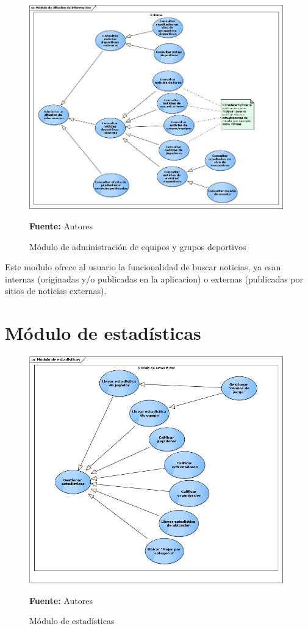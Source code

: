 \begin{figure}[!htb]
  \begin{center}
    \includegraphics[width=11cm]{./imagenes/casos_uso/difusion_informacion.png}
    \caption{Módulo de administración de equipos y grupos deportivos}
    \label{fig:cu_admin_equip_grup}
    \textbf{Fuente:} Autores
  \end{center}
\end{figure}

Este modulo ofrece al usuario la funcionalidad de buscar noticias, ya esan internas (originadas y/o publicadas en la aplicacion) o externas (publicadas por sitios de noticias externas).

\section{Módulo de estadísticas}

\begin{figure}[!htb]
  \begin{center}
    \includegraphics[width=11cm]{./imagenes/casos_uso/gestion_estadisticas.png}
    \caption{Módulo de estadísticas}
    \label{fig:cu_estad}
    \textbf{Fuente:} Autores
  \end{center}
\end{figure}

